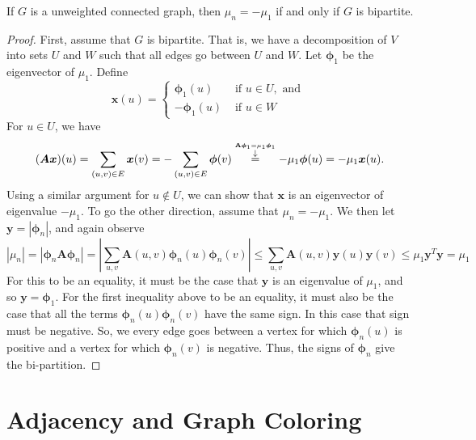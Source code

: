 \documentclass{article}
\newcommand{\bsl}[1]{\boldsymbol{#1}}
\begin{document}
\begin{lema}
  If $G$ is a unweighted connected graph, then $\mu_{n}=-\mu_{1}$ if and only if $G$ is bipartite.
\end{lema}
\begin{proof}
First, assume that $G$ is bipartite. That is, we have a decomposition of $V$ into sets $U$ and $W$ such that all edges go between $U$ and $W .$ Let $\bsl{\phi}_{1}$ be the eigenvector of $\mu_{1}$. Define
$$
\boldsymbol{x}(u)=\left\{\begin{array}{ll}
\boldsymbol{\phi}_{1}(u) & \text { if } u \in U, \text { and } \\
-\boldsymbol{\phi}_{1}(u) & \text { if } u \in W
\end{array}\right.
$$
For $u \in U$, we have
$$
\\
(\boldsymbol{A} \boldsymbol{x})(u)=\sum_{(u, v) \in E} \boldsymbol{x}(v)=-\sum_{(u, v) \in E} \boldsymbol{\phi}(v) \stackrel{\stackrel{\mathbf{A} \bsl{\phi}_{1}=\mu_{1} \bsl{\phi}_{1}}{\downarrow}}{=}-\mu_{1} \boldsymbol{\phi}(u)=-\mu_{1} \boldsymbol{x}(u) .
$$
Using a similar argument for $u \notin U$, we can show that $\bsl{x}$ is an eigenvector of eigenvalue $-\mu_{1}$.
To go the other direction, assume that $\mu_{n}=-\mu_{1} .$ We then let $\boldsymbol{y}=|\boldsymbol{\phi}_{n}|$, and again observe
$$
\left|\mu_{n}\right|=\left|\boldsymbol{\phi}_{n} \boldsymbol{A} \boldsymbol{\phi}_{n}\right|=\left|\sum_{u, v} \boldsymbol{A}(u, v) \boldsymbol{\phi}_{n}(u) \boldsymbol{\phi}_{n}(v)\right| \leq \sum_{u, v} \boldsymbol{A}(u, v) \boldsymbol{y}(u) \boldsymbol{y}(v) \leq \mu_{1} \boldsymbol{y}^{T} \boldsymbol{y}=\mu_{1}
$$
For this to be an equality, it must be the case that $\boldsymbol{y}$ is an eigenvalue of $\mu_{1}$, and so $\boldsymbol{y}=\bsl{\phi}_{1}$. For the first inequality above to be an equality, it must also be the case that all the terms $\boldsymbol{\phi}_{n}(u) \boldsymbol{\phi}_{n}(v)$ have the same sign. In this case that sign must be negative. So, we every edge goes between a vertex for which $\bsl{\phi}_{n}(u)$ is positive and a vertex for which $\bsl{\phi}_{n}(v)$ is negative. Thus, the signs of $\bsl{\phi}_{n}$ give the bi-partition.
\end{proof}

\section{Adjacency and Graph Coloring}
\end{document}
